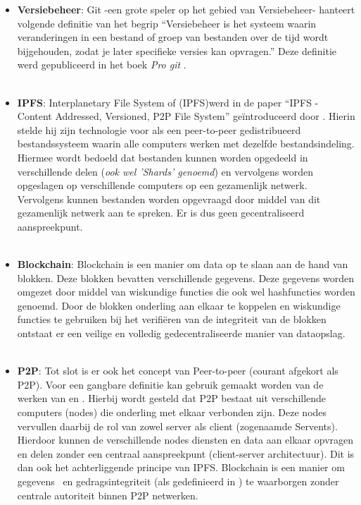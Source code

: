 \begin{itemize}
\item \textbf{Versiebeheer}: Git -een grote speler op het gebied van Versiebeheer- hanteert volgende definitie van het begrip “Versiebeheer is het systeem waarin veranderingen in een bestand of groep van bestanden over de tijd wordt bijgehouden, zodat je later specifieke versies kan opvragen.” Deze definitie werd gepubliceerd in het boek \textit{Pro git} \autocite{Chacon2014}. \\\\

\item \textbf{IPFS}: Interplanetary File System of (IPFS)werd in de paper “IPFS - Content Addressed, Versioned, P2P File System” geïntroduceerd door \textcite{Benet2014}. Hierin stelde hij zijn technologie voor als een peer-to-peer gedistribueerd bestandssysteem waarin alle computers werken met dezelfde bestandsindeling. Hiermee wordt bedoeld dat bestanden kunnen worden opgedeeld in verschillende delen (\textit{ook wel 'Shards' genoemd}) en vervolgens worden opgeslagen op verschillende computers op een gezamenlijk netwerk. Vervolgens kunnen bestanden worden opgevraagd door middel van dit gezamenlijk netwerk aan te spreken. Er is dus geen gecentraliseerd aanspreekpunt.\\\\

\item \textbf{Blockchain}: Blockchain is een manier om data op te slaan aan de hand van blokken. Deze blokken bevatten verschillende gegevens. Deze gegevens worden omgezet door middel van wiskundige functies die ook wel hashfuncties worden genoemd. Door de blokken onderling aan elkaar te koppelen en wiskundige functies te gebruiken bij het verifiëren van de integriteit van de blokken ontstaat er een veilige en volledig gedecentraliseerde manier van dataopslag.\\\\

\item \textbf{P2P}: Tot slot is er ook het concept van Peer-to-peer (courant afgekort als P2P). Voor een gangbare definitie kan gebruik gemaakt worden van de werken van \textcite{Schollmeier2001} en \textcite{IAB5694}. Hierbij wordt gesteld dat P2P bestaat uit verschillende computers (nodes) die onderling met elkaar verbonden zijn. Deze nodes vervullen daarbij de rol van zowel server als client (zogenaamde Servents). Hierdoor kunnen de verschillende nodes diensten en data aan elkaar opvragen en delen zonder een centraal aanspreekpunt (client-server architectuur). Dit is dan ook het achterliggende principe van IPFS. Blockchain is een manier om gegevens~ en gedragsintegriteit (als gedefinieerd in \autocite{Drescher2017}) te waarborgen zonder centrale autoriteit binnen P2P netwerken.\\
\end{itemize}

